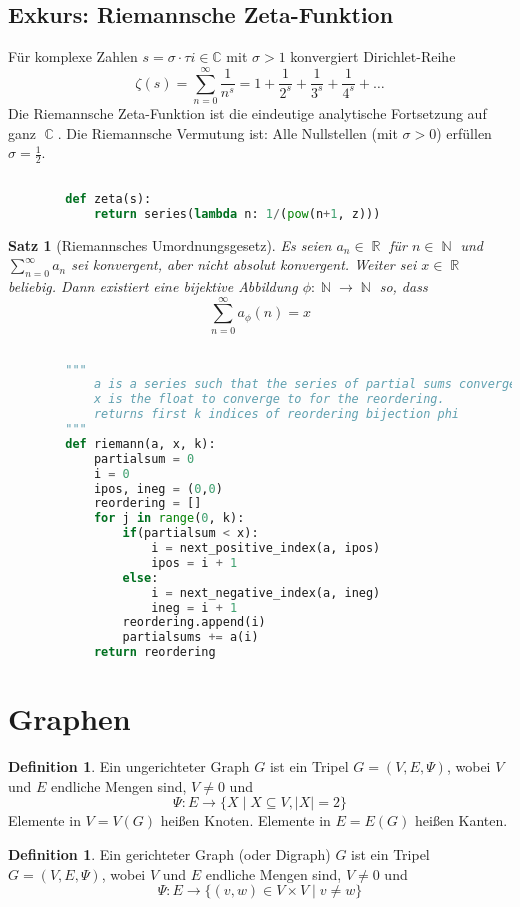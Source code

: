 \documentclass[a4paper,12pt]{article}
\DeclareMathOperator{\N}{\mathbb N}
\DeclareMathOperator{\R}{\mathbb R}
\DeclareMathOperator{\C}{\mathbb C}
\newtheorem{satz}[axiom]{Satz}
\theoremstyle{definition}
\newtheorem{definition}[axiom]{Definition}
\begin{document}
	\subsection{Exkurs: Riemannsche Zeta-Funktion}
	Für komplexe Zahlen $s = \sigma \cdot \tau i \in \mathbb{C}$ mit $\sigma > 1$ konvergiert Dirichlet-Reihe
	\[
		\zeta(s) = \sum_{n = 0}^{\infty} \frac{1}{n^s} = 1 + \frac{1}{2^s} + \frac{1}{3^s} + \frac{1}{4^s} + \ldots
	\]
	Die Riemannsche Zeta-Funktion ist die eindeutige analytische Fortsetzung auf ganz $\C$.
	Die Riemannsche Vermutung ist: Alle Nullstellen (mit $\sigma > 0$) erfüllen $\sigma = \frac{1}{2}$.
	\begin{lstlisting}[language=Python]
		
		def zeta(s):
			return series(lambda n: 1/(pow(n+1, z)))
	\end{lstlisting}
	\begin{satz}[Riemannsches Umordnungsgesetz]
		Es seien $a_n \in \R$ für $n \in \N$ und $\sum_{n = 0}^{\infty}a_n$ sei konvergent, aber nicht absolut konvergent. Weiter sei $x \in \R$ beliebig. Dann existiert eine bijektive Abbildung $\phi: \N \to \N$ so, dass
		\[
			\sum_{n = 0}^{\infty} a_\phi(n) = x
		\]
	\end{satz}
	\begin{lstlisting}[language=Python, caption={Riemann-Reordering}]
		
		"""
			a is a series such that the series of partial sums converges, but not absolutely. 
			x is the float to converge to for the reordering.
			returns first k indices of reordering bijection phi
		"""
		def riemann(a, x, k):
			partialsum = 0
			i = 0
			ipos, ineg = (0,0)
			reordering = []
			for j in range(0, k):
				if(partialsum < x):
					i = next_positive_index(a, ipos)
					ipos = i + 1
				else:
					i = next_negative_index(a, ineg)
					ineg = i + 1
				reordering.append(i)
				partialsums += a(i)
			return reordering
	\end{lstlisting}
	\section{Graphen}
	\begin{definition}
		Ein ungerichteter Graph $G$ ist ein Tripel $G = (V, E, \Psi)$, wobei $V$ und $E$ endliche Mengen sind, $V \neq 0$ und
		\[
			\Psi: E \to \{X \mid X \subseteq V, \lvert X \rvert = 2\}
		\]
		Elemente in $V = V(G)$ heißen Knoten. Elemente in $E = E(G)$ heißen Kanten.
	\end{definition}
	\begin{definition}
		Ein gerichteter Graph (oder Digraph) $G$ ist ein Tripel $G = (V, E, \Psi)$, wobei $V$ und $E$ endliche Mengen sind, $V \neq 0$ und
		\[
			\Psi: E \to \{(v,w) \in V \times V \mid v \neq w\}
		\]
	\end{definition}
\end{document}
